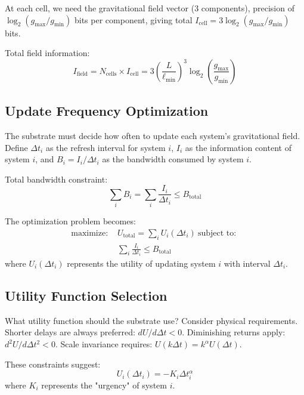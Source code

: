 \documentclass[usenatbib]{mnras}
\begin{document}
At each cell, we need the gravitational field vector (3 components), precision of $\log_2(g_{\text{max}}/g_{\text{min}})$ bits per component, giving total $I_{\text{cell}} = 3 \log_2(g_{\text{max}}/g_{\text{min}})$ bits.

Total field information:
\begin{equation}
I_{\text{field}} = N_{\text{cells}} \times I_{\text{cell}} = 3\left(\frac{L}{\ell_{\text{min}}}\right)^3 \log_2\left(\frac{g_{\text{max}}}{g_{\text{min}}}\right)
\end{equation}

\subsection{Update Frequency Optimization}

The substrate must decide how often to update each system's gravitational field. Define $\Delta t_i$ as the refresh interval for system $i$, $I_i$ as the information content of system $i$, and $B_i = I_i/\Delta t_i$ as the bandwidth consumed by system $i$.

Total bandwidth constraint:
\begin{equation}
\sum_i B_i = \sum_i \frac{I_i}{\Delta t_i} \leq B_{\text{total}}
\end{equation}

The optimization problem becomes:
\begin{align}
\text{maximize: } & U_{\text{total}} = \sum_i U_i(\Delta t_i) \
\text{subject to: }\\ & \sum_i \frac{I_i}{\Delta t_i} \leq B_{\text{total}}
\end{align}
where $U_i(\Delta t_i)$ represents the utility of updating system $i$ with interval $\Delta t_i$.

\subsection{Utility Function Selection}

What utility function should the substrate use? Consider physical requirements. Shorter delays are always preferred: $dU/d\Delta t < 0$. Diminishing returns apply: $d^2U/d\Delta t^2 < 0$. Scale invariance requires: $U(k\Delta t) = k^\alpha U(\Delta t)$.

These constraints suggest:
\begin{equation}
U_i(\Delta t_i) = -K_i \Delta t_i^\alpha
\end{equation}
where $K_i$ represents the "urgency" of system $i$.
\end{document}
